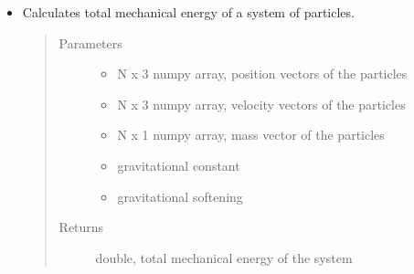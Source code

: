 \documentclass[letterpaper,10pt,english]{sphinxmanual}
\begin{document}
\begin{DUlineblock}{0em}
\item[] 
\end{DUlineblock}
\begin{itemize}
\item {} 

\begin{fulllineitems}
\label{\detokenize{physics:nbody.lib.physics.calc_te}}
\sphinxAtStartPar
Calculates total mechanical energy of a system of particles.
\begin{quote}\begin{description}
\item[{Parameters}] \leavevmode\begin{itemize}
\item {} 
\sphinxAtStartPar
{} \textendash{} N x 3 numpy array, position vectors of the particles

\item {} 
\sphinxAtStartPar
{} \textendash{} N x 3 numpy array, velocity vectors of the particles

\item {} 
\sphinxAtStartPar
{} \textendash{} N x 1 numpy array, mass vector of the particles

\item {} 
\sphinxAtStartPar
{} \textendash{} gravitational constant

\item {} 
\sphinxAtStartPar
{} \textendash{} gravitational softening

\end{itemize}

\item[{Returns}] \leavevmode
\sphinxAtStartPar
double, total mechanical energy of the system

\end{description}\end{quote}

\end{fulllineitems}


\end{itemize}
\end{document}
